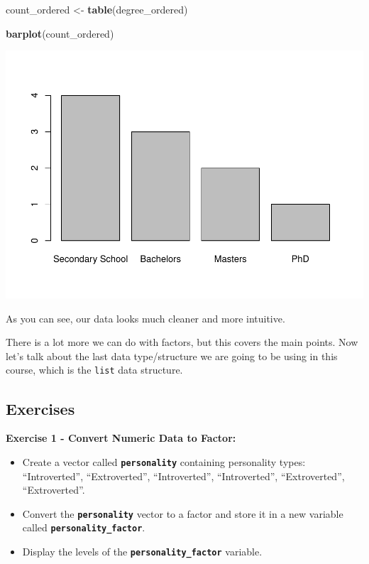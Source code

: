 \documentclass[
]{book}
\newenvironment{Shaded}{\begin{snugshade}}{\end{snugshade}}
\newcommand{\FunctionTok}[1]{\textcolor[rgb]{0.13,0.29,0.53}{\textbf{#1}}}
\newcommand{\NormalTok}[1]{#1}
\newcommand{\OtherTok}[1]{\textcolor[rgb]{0.56,0.35,0.01}{#1}}
\begin{document}
\begin{Shaded}
\begin{Highlighting}[]
\NormalTok{count\_ordered }\OtherTok{\textless{}{-}} \FunctionTok{table}\NormalTok{(degree\_ordered)}

\FunctionTok{barplot}\NormalTok{(count\_ordered)}
\end{Highlighting}
\end{Shaded}

\includegraphics{rintro_demo_files/figure-latex/unnamed-chunk-136-1.pdf}

As you can see, our data looks much cleaner and more intuitive.

There is a lot more we can do with factors, but this covers the main points. Now let's talk about the last data type/structure we are going to be using in this course, which is the \texttt{list} data structure.

\hypertarget{exercises-5}{%
\subsection{Exercises}\label{exercises-5}}

\textbf{Exercise 1 - Convert Numeric Data to Factor:}

\begin{itemize}
\item
  Create a vector called \textbf{\texttt{personality}} containing personality types: ``Introverted'', ``Extroverted'', ``Introverted'', ``Introverted'', ``Extroverted'', ``Extroverted''.
\item
  Convert the \textbf{\texttt{personality}} vector to a factor and store it in a new variable called \textbf{\texttt{personality\_factor}}.
\item
  Display the levels of the \textbf{\texttt{personality\_factor}} variable.
\end{itemize}
\end{document}
